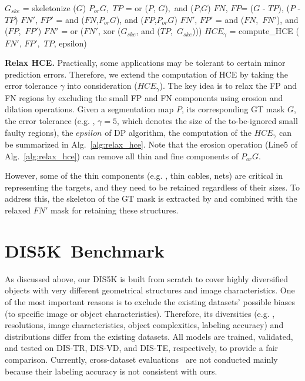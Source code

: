 \begin{algorithm}[t!]
\scriptsize
{}
$G_{ske}$ = skeletonize ($G$)\;
$P_{or}G$,~$TP$ = or ($P$, $G$),~and ($P$,$G$)\;
$FN$, $FP$=  ($G$ - $TP$), ($P$ - $TP$)\;
$FN'$, $FP'$ = and ($FN$,$P_{or}G$), and ($FP$,$P_{or}G$)\;
$FN'$, $FP'$ = and ($FN$,~$FN'$), and ($FP$,~$FP'$)\;
$FN'$ = or ($FN'$, xor ($G_{ske}$, and ($TP$,~$G_{ske}$)))\;
$HCE_{\gamma}$ = compute\_HCE ($FN'$, $FP'$,~$TP$, epsilon)
\caption{\small Relax HCE.}
\label{alg:relax_hce}

\end{algorithm}

\textbf{Relax HCE.} Practically, some applications may be tolerant to certain minor prediction errors. Therefore, we extend the computation of HCE by taking the error tolerance $\gamma$ into consideration ($HCE_{\gamma}$). The key idea is to relax the FP and FN regions by excluding the small FP and FN components using erosion \cite{haralick1987image} and dilation \cite{haralick1987image} operations. Given a segmentation map $P$, its corresponding GT mask $G$, the error tolerance (e.g. , $\gamma=5$, which denotes the size of the to-be-ignored small faulty regions), the $epsilon$ of DP algorithm, the computation of the $HCE_{\gamma}$ can be summarized in Alg.~\ref{alg:relax_hce}. Note that the erosion operation (Line5 of Alg.~\ref{alg:relax_hce}) can remove all thin and fine components of $P_{or}G$. 

However, some of the thin components (e.g. , thin cables, nets) are critical in representing the targets, and they need to be retained regardless of their sizes. To address this, the skeleton of the GT mask is extracted by \cite{DBLP:journals/cacm/ZhangS84} and combined with the relaxed $FN'$ mask for retaining these structures. 

\section{DIS5K~Benchmark}

As discussed above, our DIS5K is built from scratch to cover highly diversified objects with very different geometrical structures and image characteristics. One of the most important reasons is to exclude the existing datasets' possible biases (to specific image or object characteristics). Therefore, its diversities (e.g. , resolutions, image characteristics, object complexities, labeling accuracy) and distributions differ from the existing datasets. All models are trained, validated, and tested on DIS-TR, DIS-VD, and DIS-TE, respectively, to provide a fair comparison. Currently, cross-dataset evaluations~\cite{torralba2011unbiased} are not conducted mainly because their labeling accuracy is not consistent with ours.

